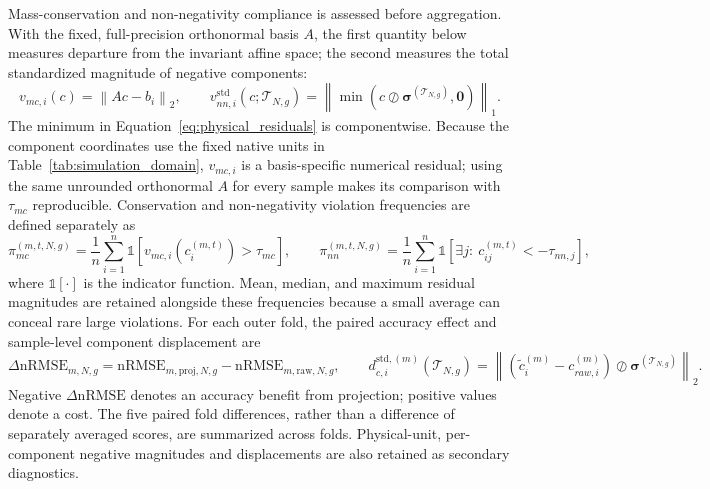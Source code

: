 \documentclass[a4paper,fleqn]{cas-sc}
\begin{document}
Mass-conservation and non-negativity compliance is assessed before aggregation. With the fixed, full-precision orthonormal basis $A$, the first quantity below measures departure from the invariant affine space; the second measures the total standardized magnitude of negative components:
\begin{equation}
\label{eq:physical_residuals}
v_{mc,i}(c)=\left\|Ac-b_i\right\|_2,\qquad
v_{nn,i}^{\mathrm{std}}\!\left(c;\mathcal{T}_{N,g}\right)
=\left\|\min\!\left(c\oslash\boldsymbol{\sigma}^{(\mathcal{T}_{N,g})},
\mathbf{0}\right)\right\|_1.
\end{equation}
The minimum in Equation~\eqref{eq:physical_residuals} is componentwise. Because the component coordinates use the fixed native units in Table~\ref{tab:simulation_domain}, $v_{mc,i}$ is a basis-specific numerical residual; using the same unrounded orthonormal $A$ for every sample makes its comparison with $\tau_{mc}$ reproducible. Conservation and non-negativity violation frequencies are defined separately as
\begin{equation}
\pi_{mc}^{(m,t,N,g)}=\frac{1}{n}\sum_{i=1}^{n}
\mathbb{1}\!\left[v_{mc,i}\!\left(c_i^{(m,t)}\right)>\tau_{mc}\right],\qquad
\pi_{nn}^{(m,t,N,g)}=\frac{1}{n}\sum_{i=1}^{n}
\mathbb{1}\!\left[\exists j:\ c_{ij}^{(m,t)}<-\tau_{nn,j}\right],
\label{eq:violation_frequencies}
\end{equation}
where $\mathbb{1}[\cdot]$ is the indicator function. Mean, median, and maximum residual magnitudes are retained alongside these frequencies because a small average can conceal rare large violations. For each outer fold, the paired accuracy effect and sample-level component displacement are
\begin{equation}
\Delta\mathrm{nRMSE}_{m,N,g}
=\mathrm{nRMSE}_{m,\mathrm{proj},N,g}
-\mathrm{nRMSE}_{m,\mathrm{raw},N,g},\qquad
d_{c,i}^{\mathrm{std},(m)}\!\left(\mathcal{T}_{N,g}\right)
=\left\|\left(\tilde c_i^{(m)}-c_{raw,i}^{(m)}\right)
\oslash\boldsymbol{\sigma}^{(\mathcal{T}_{N,g})}\right\|_2.
\end{equation}
Negative $\Delta\mathrm{nRMSE}$ denotes an accuracy benefit from projection; positive values denote a cost. The five paired fold differences, rather than a difference of separately averaged scores, are summarized across folds. Physical-unit, per-component negative magnitudes and displacements are also retained as secondary diagnostics.
\end{document}
